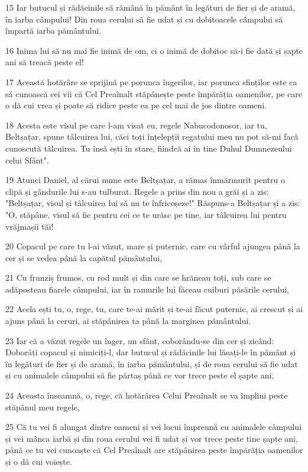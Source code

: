 \par 15 Iar butucul și rădăcinile să rămână în pământ în legături de fier și de aramă, în iarba câmpului! Din roua cerului să fie udat și cu dobitoacele câmpului să împartă iarba pământului.
\par 16 Inima lui să nu mai fie inimă de om, ci o inimă de dobitoc să-i fie dată și șapte ani să treacă peste el!
\par 17 Această hotărâre se sprijină pe porunca îngerilor, iar porunca sfinților este ca să cunoască cei vii că Cel Preaînalt stăpânește peste împărăția oamenilor, pe care o dă cui vrea și poate să ridice peste ea pe cel mai de jos dintre oameni.
\par 18 Acesta este visul pe care l-am visat eu, regele Nabucodonosor, iar tu, Beltșațar, spune tâlcuirea lui, căci toți înțelepții regatului meu nu pot să-mi facă cunoscută tâlcuirea. Tu însă ești în stare, fiindcă ai în tine Duhul Dumnezeului celui Sfânt".
\par 19 Atunci Daniel, al cărui nume este Beltșațar, a rămas înmărmurit pentru o clipă și gândurile lui s-au tulburat. Regele a prins din nou a grăi și a zis: "Beltșațar, visul și tâlcuirea lui să nu te înfricoșeze!" Răspuns-a Beltșațar și a zis: "O, stăpâne, visul să fie pentru cei ce te urăsc pe tine, iar tâlcuirea lui pentru vrăjmașii tăi!
\par 20 Copacul pe care tu l-ai văzut, mare și puternic, care cu vârful ajungea până la cer și se vedea până la capătul pământului,
\par 21 Cu frunziș frumos, cu rod mult și din care se hrăneau toți, sub care se adăposteau fiarele câmpului, iar în ramurile lui făceau cuiburi păsările cerului,
\par 22 Acela ești tu, o, rege, tu, care te-ai mărit și te-ai făcut puternic, ai crescut și ai ajuns până la ceruri, ai stăpânirea ta până la marginea pământului.
\par 23 Iar că a văzut regele un înger, un sfânt, coborându-se din cer și zicând: Doborâți copacul și nimiciți-l, dar butucul și rădăcinile lui lăsați-le în pământ și în legături de fier și de aramă, în iarba pământului, și de roua cerului să fie udat și cu animalele câmpului să fie părtaș până ce vor trece peste el șapte ani,
\par 24 Aceasta înseamnă, o, rege, că hotărârea Celui Preaînalt se va împlini peste stăpânul meu regele,
\par 25 Că tu vei fi alungat dintre oameni și vei locui împreună cu animalele câmpului și vei mânca iarbă și din roua cerului vei fi udat și vor trece peste tine șapte ani, până ce tu vei cunoaște că Cel Preaînalt are stăpânirea peste împărăția oamenilor și o dă cui voiește.
